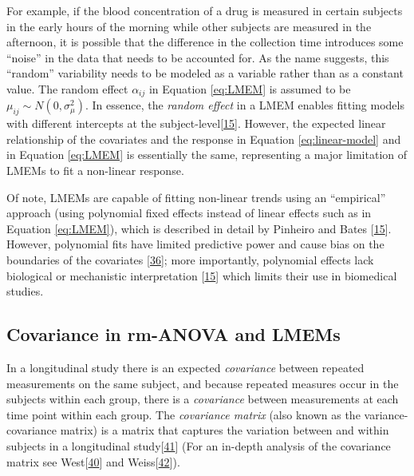 \documentclass[
]{article}
\begin{document}
For example, if the blood concentration of a drug is measured in certain subjects in the early hours of the morning while other subjects are measured in the afternoon, it is possible that the difference in the collection time introduces some ``noise'' in the data that needs to be accounted for. As the name suggests, this ``random'' variability needs to be modeled as a variable rather than as a constant value. The random effect \(\alpha_{ij}\) in Equation \eqref{eq:LMEM} is assumed to be \(\mu_{ij} \sim N(0,\sigma^2_\mu)\). In essence, the \emph{random effect} in a LMEM enables fitting models with different intercepts at the subject-level{[}\protect\hyperlink{ref-pinheiro2006}{15}{]}. However, the expected linear relationship of the covariates and the response in Equation \eqref{eq:linear-model} and in Equation \eqref{eq:LMEM} is essentially the same, representing a major limitation of LMEMs to fit a non-linear response.

Of note, LMEMs are capable of fitting non-linear trends using an ``empirical'' approach (using polynomial fixed effects instead of linear effects such as in Equation \eqref{eq:LMEM}), which is described in detail by Pinheiro and Bates {[}\protect\hyperlink{ref-pinheiro2006}{15}{]}. However, polynomial fits have limited predictive power and cause bias on the boundaries of the covariates {[}\protect\hyperlink{ref-beck1998}{36}{]}; more importantly, polynomial effects lack biological or mechanistic interpretation {[}\protect\hyperlink{ref-pinheiro2006}{15}{]} which limits their use in biomedical studies.

\hypertarget{covariance-in-rm-anova-and-lmems}{%
\subsection{Covariance in rm-ANOVA and LMEMs}\label{covariance-in-rm-anova-and-lmems}}

In a longitudinal study there is an expected \emph{covariance} between repeated measurements on the same subject, and because repeated measures occur in the subjects within each group, there is a \emph{covariance} between measurements at each time point within each group. The \emph{covariance matrix} (also known as the variance-covariance matrix) is a matrix that captures the variation between and within subjects in a longitudinal study{[}\protect\hyperlink{ref-wolfinger1996}{41}{]} (For an in-depth analysis of the covariance matrix see West{[}\protect\hyperlink{ref-west2014}{40}{]} and Weiss{[}\protect\hyperlink{ref-weiss2005}{42}{]}).
\end{document}
